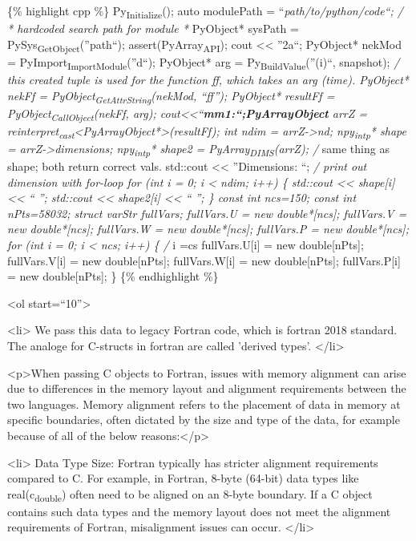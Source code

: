 \documentclass[11pt]{article}
\begin{document}
\{\% highlight cpp \%\}
Py\textsubscript{Initialize}();
auto modulePath = ``\emph{path/to/python/code``; /} \emph{* hardcoded search path for module *}
PyObject* sysPath = PySys\textsubscript{GetObject}(''path``);
assert(PyArray\textsubscript{API});
cout << ''2a\n``;  PyObject* nekMod = PyImport\textsubscript{ImportModule}(''d``);
PyObject* arg = Py\textsubscript{BuildValue}(''(i)``, snapshot); \emph{/ this created tuple is used for the function ff, which takes an arg (time).
PyObject* nekFf = PyObject\textsubscript{GetAttrString}(nekMod, ``ff'');
PyObject* resultFf = PyObject\textsubscript{CallObject}(nekFf, arg);
cout<<``\textbf{mm1:\n``;PyArrayObject} arrZ = reinterpret\textsubscript{cast}<PyArrayObject*>(resultFf);
int ndim = arrZ->nd;
npy\textsubscript{intp}* shape = arrZ->dimensions;
npy\textsubscript{intp}* shape2 = PyArray\textsubscript{DIMS}(arrZ); /} same thing as shape; both return correct vals.
std::cout << ''Dimensions: ``; \emph{/ print out dimension with for-loop
for (int i = 0; i < ndim; i++) \{
  std::cout << shape[i] << `` '';
  std::cout << shape2[i] << `` '';
\}
const int ncs=150;
const int nPts=58032;
struct varStr fullVars;
fullVars.U = new double*[ncs];
fullVars.V = new double*[ncs];
fullVars.W = new double*[ncs];
fullVars.P = new double*[ncs];
for (int i = 0; i < ncs; i++) \{ /} i =cs
  fullVars.U[i] = new double[nPts];
  fullVars.V[i] = new double[nPts];
  fullVars.W[i] = new double[nPts];
  fullVars.P[i] = new double[nPts];
\}
\{\% endhighlight \%\}


<ol start=``10''>

<li> We pass this data to legacy Fortran code, which is fortran 2018 standard.
The analoge for C-structs in fortran are called 'derived types'. </li>

<p>When passing C objects to Fortran, issues with memory alignment can arise due to differences in the memory layout and alignment requirements between the two languages. Memory alignment refers to the placement of data in memory at specific boundaries, often dictated by the size and type of the data, for example because of all of the below reasons:</p>

<li> Data Type Size: Fortran typically has stricter alignment requirements compared to C. For example, in Fortran, 8-byte (64-bit) data types like real(c\textsubscript{double}) often need to be aligned on an 8-byte boundary. If a C object contains such data types and the memory layout does not meet the alignment requirements of Fortran, misalignment issues can occur. </li>
\end{document}

